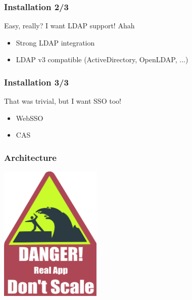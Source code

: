 \documentclass{beamer}
\begin{document}
\begin{frame}
    \frametitle{Installation 2/3}

    \begin{block}{Easy, really? I want LDAP support! Ahah}
        \begin{itemize}
            \item Strong LDAP integration
            \item LDAP v3 compatible (ActiveDirectory, OpenLDAP, ...)
        \end{itemize}
    \end{block}

\end{frame}

\begin{frame}
    \frametitle{Installation 3/3}

    \begin{block}{That was trivial, but I want SSO too!}
        \begin{itemize}
            \item WebSSO
            \item CAS
        \end{itemize}
    \end{block}

\end{frame}

\begin{frame}
    \frametitle{Architecture}

    \includegraphics[height=6.5cm]{pics/scale.pdf}

\end{frame}
\end{document}
